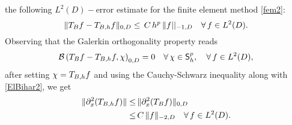 \documentclass[10pt]{amsart}
\numberwithin{equation}{section}
\begin{document}
the following $L^2(D)-$error estimate for the finite element method \eqref{fem2}:
\begin{equation}\label{ARA1}
\|T_{{\scriptscriptstyle} B}f-T_{{\scriptscriptstyle} B,h}f\|_{{\scriptscriptstyle} 0,D}
\leq\,C\,h^p\,\|f||_{{\scriptscriptstyle} -1,D}\quad\forall\,f\in L^2(D).
\end{equation}
Observing that the Galerkin orthogonality property reads
\begin{equation*}
{\mathcal B}\left(T_{{\scriptscriptstyle} B}f-T_{{\scriptscriptstyle} B,h}f,\chi\right)_{{\scriptscriptstyle} 0,D}=0
\quad\forall\,\chi\in{\sf S}_h^p,\quad\forall\,f\in L^2(D),
\end{equation*}
after setting $\chi=T_{{\scriptscriptstyle} B,h}f$ and using the Cauchy-Schwarz inequality
along with \eqref{ElBihar2}, we get
\begin{equation}\label{TB_bound}
\begin{split}
\|\partial_x^2(T_{{\scriptscriptstyle} B,h}f)\|\leq&\,\|\partial_x^2(T_{{\scriptscriptstyle} B}f)\|_{{\scriptscriptstyle} 0,D}\\
\leq&\,C\,\|f\|_{{\scriptscriptstyle} -2,D}\quad\forall\,f\in L^2(D).\\
\end{split}
\end{equation}
\end{document}
